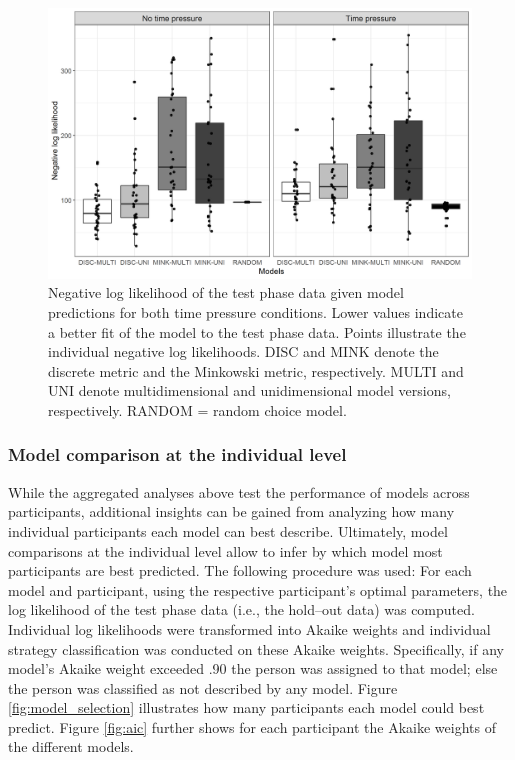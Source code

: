 \documentclass[a4paper,man,natbib]{apa6}
\begin{document}
\begin{figure}
\centering
\includegraphics[width = \textwidth]{fig_log_lik.png}
\caption{Negative log likelihood of the test phase data given model predictions for both time pressure conditions. Lower values indicate a better fit of the model to the test phase data. Points illustrate the individual negative log likelihoods. DISC and MINK denote the discrete metric and the Minkowski metric, respectively. MULTI and UNI denote multidimensional and unidimensional model versions, respectively. RANDOM = random choice model.}
\label{fig:log_lik}
\end{figure}

\subsubsection{Model comparison at the individual level} \label{sec:res_ind}
While the aggregated analyses above test the performance of models across participants, additional insights can be gained from analyzing how many individual participants each model can best describe. Ultimately, model comparisons at the individual level allow to infer by which model most participants are best predicted. 
The following procedure was used: For each model and participant, using the respective participant's optimal parameters, the log likelihood of the test phase data (i.e., the hold--out data) was computed. Individual log likelihoods were transformed into Akaike weights \citep{wagenmakers2004aic} and individual strategy classification was conducted on these Akaike weights. Specifically, if any model’s Akaike weight exceeded .90 the person was assigned to that model; else the person was classified as not described by any model. Figure \ref{fig:model_selection} illustrates how many participants each model could best predict. Figure \ref{fig:aic} further shows for each participant the Akaike weights of the different models.
\end{document}
